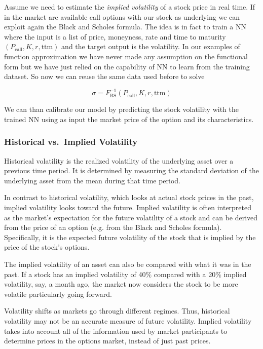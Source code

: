 Assume we need to estimate the \emph{implied volatility} of a stock price
in real time. If in the market are available call options with our stock
as underlying we can exploit again the Black and Scholes formula. The
idea is in fact to train a NN where the input is a list of price,
moneyness, rate and time to maturity
\((P_\textrm{call}, K, r, \mathrm{ttm})\) and the target output is the
volatility. In our examples of function approximation we have never made any assumption on the functional form but we have just relied on the capability of NN to learn from the training dataset. So now we can reuse the same data used before to solve

\[ \sigma = F^{-1}_\textrm{BS}(P_\textrm{call}, K, r, \mathrm{ttm})\]

We can than calibrate our model by predicting the stock volatility with
the trained NN using as input the market price of the option and its
characteristics.

\subsubsection{Historical vs.~Implied
		Volatility}\label{historical-vs.-implied-volatility}

Historical volatility is the realized volatility of the underlying asset over a previous time period. It is determined by measuring the standard deviation of the underlying asset from the mean during that time period.

In contrast to historical volatility, which looks at actual stock prices in the past, implied volatility looks toward the future. Implied volatility is often interpreted as the market's expectation for the future volatility of a stock and can be derived from the price of an option (e.g. from the Black and Scholes formula).
Specifically, it is the expected future volatility of the stock that is implied by the price of the stock's options.

The implied volatility of an asset can also be compared with what it was in the past. If a stock has an implied volatility of 40\% compared with a 20\% implied volatility, say, a month ago, the market now considers the stock to be more volatile particularly going forward.

Volatility shifts as markets go through different regimes. Thus, historical volatility may not be an accurate measure of future volatility. Implied volatility
takes into account all of the information used by market participants to 
determine prices in the options market, instead of just past prices.

